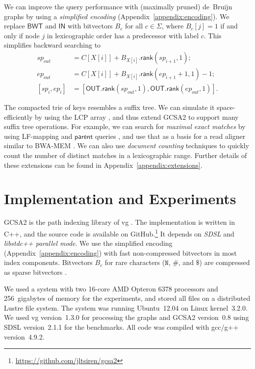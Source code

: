\documentclass[twoside,leqno,twocolumn]{article}
\newcommand{\baseN}{\mathtt{N}}
\newcommand{\rank}{\ensuremath{\mathsf{rank}}}
\newcommand{\parent}{\ensuremath{\mathsf{parent}}}
\newcommand{\LFmapping}{LF\nobreakdash-mapping}
\newcommand{\BWT}{\ensuremath{\mathsf{BWT}}}
\newcommand{\bvIN}{\ensuremath{\mathsf{IN}}}
\newcommand{\bvOUT}{\ensuremath{\mathsf{OUT}}}
\begin{document}
We can improve the query performance with (maximally pruned) de~Bruijn graphs by using a \emph{simplified encoding} (Appendix~\ref{appendix:encoding}). We replace $\BWT$ and $\bvIN$ with bitvectors $B_{c}$ for all $c \in \Sigma$, where $B_{c}[j] = 1$ if and only if node $j$ in lexicographic order has a predecessor with label $c$. This simplifies backward searching to
\begin{align*}
sp_{out} & = C[X[i]] + B_{X[i]}.\rank(sp_{i+1}, 1); \\
ep_{out} & = C[X[i]] + B_{X[i]}.\rank(ep_{i+1}+1, 1) - 1; \\
[sp_{i}, ep_{i}] & = [\bvOUT.\rank(sp_{out}, 1), \bvOUT.\rank(ep_{out}, 1)].
\end{align*}

The compacted trie of keys resembles a suffix tree. We can simulate it space-efficiently by using the LCP array \cite{Abouelhoda2004,Fischer2009a}, and thus extend GCSA2 to support many suffix tree operations. For example, we can search for \emph{maximal exact matches} by using \LFmapping{} and $\parent$ queries \cite{Ohlebusch2010a}, and use that as a basis for a read aligner similar to BWA-MEM \cite{Li2013}. We can also use \emph{document counting} techniques \cite{Sadakane2007a} to quickly count the number of distinct matches in a lexicographic range. Further details of these extensions can be found in Appendix~\ref{appendix:extensions}.


\section{Implementation and Experiments}\label{sect:experiments}

GCSA2 is the path indexing library of vg \cite{Garrison2014-2016}. The implementation is written in C++, and the source code is available on GitHub.\footnote{\url{https://github.com/jltsiren/gcsa2}} It depends on \emph{SDSL} \cite{Gog2014b} and \emph{libstdc++ parallel mode}. We use the simplified encoding (Appendix~\ref{appendix:encoding}) with fast non-compressed bitvectors in most index components. Bitvectors $B_{c}$ for rare characters ($\baseN$, $\#$, and $\$$) are compressed as sparse bitvectors \cite{Okanohara2007}.

We used a system with two 16\nobreakdash-core AMD Opteron 6378 processors and 256~gigabytes of memory for the experiments, and stored all files on a distributed Lustre file system. The system was running Ubuntu~12.04 on Linux kernel~3.2.0. We used vg version~1.3.0 for processing the graphs and GCSA2 version~0.8 using SDSL version~2.1.1 for the benchmarks. All code was compiled with gcc/g++ version~4.9.2.
\end{document}
